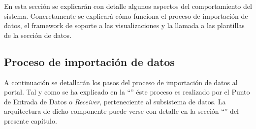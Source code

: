 En esta sección se explicarán con detalle algunos aspectos del comportamiento del sistema.  Concretamente se explicará cómo funciona el proceso de importación de datos, el framework de soporte a las visualizaciones y la llamada a las plantillas de la sección de datos.



\subsection{Proceso de importación de datos}
\label{actividad:receiver}
A continuación se detallarán los pasos del proceso de importación de datos al portal.  Tal y como se ha explicado en la ``'' éste proceso es realizado por el Punto de Entrada de Datos o \textit{Receiver}, perteneciente al subsistema de datos.  La arquitectura de dicho componente puede verse con detalle en la sección ``'' del presente capítulo.

